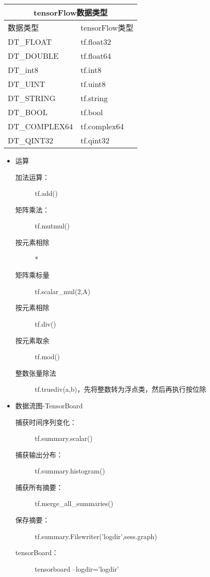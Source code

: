 \documentclass[UTF8]{article}%
\begin{document}
			\center
			\begin{tabular}[c]{|l|l|}
				\hline
				\multicolumn{2}{|c|}{tensorFlow数据类型}\\
				\hline
				数据类型 & tensorFlow类型 \\
				\hline
				DT\_FLOAT & tf.float32  \\
				\hline
				DT\_DOUBLE & tf.float64 \\
				\hline
				DT\_int8 & tf.int8  \\
				\hline
				DT\_UINT & tf.uint8  \\
				\hline
				DT\_STRING & tf.string  \\
				\hline
				DT\_BOOL & tf.bool  \\
				\hline
				DT\_COMPLEX64 & tf.complex64  \\
				\hline
				DT\_QINT32 & tf.qint32  \\
				\hline
			\end{tabular}
			\begin{itemize}
				\item 运算
				\begin{description}
					\item[加法运算：]tf.add()
					\item[矩阵乘法：] tf.mutmul()
					\item[按元素相除] *
					\item[矩阵乘标量] tf.scalar\_mul(2,A)
					\item[按元素相除] tf.div()
					\item[按元素取余] tf.mod()
					\item[整数张量除法] tf.truediv(a,b)，先将整数转为浮点类，然后再执行按位除
				\end{description}
			\item 数据流图-TensorBoard
				\begin{description}
					\item[捕获时间序列变化：] tf.summary.scalar()
					\item[捕获输出分布：]  tf.summary.histogram()
					\item[捕获所有摘要：] tf.merge\_all\_summaries()
					\item[保存摘要：] tf.summary.Filewriter('logdir',sess.graph)
					\item[tensorBoard：] tensorboard --logdir='logdir'
				\end{description}
			\end{itemize}
\end{document}
